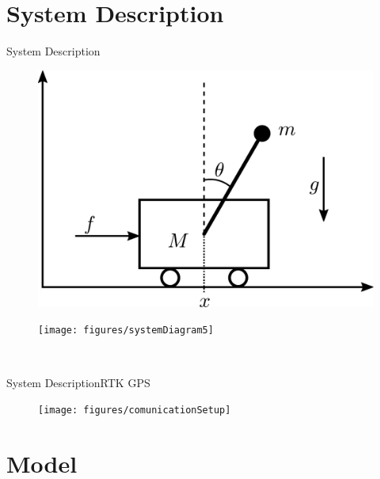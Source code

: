 \section{System Description}
\begin{frame}{System Description}{}
    \begin{minipage}{0.47\linewidth}
    \begin{figure}[H]
        \centering
        \includegraphics[width=1\linewidth]{figures/system}
    \end{figure}        
    \end{minipage}\hfill      
    \begin{minipage}{0.49\linewidth}
    \begin{figure}[H]
        \centering
        \texttt{[image: figures/systemDiagram5]}
    \end{figure}                
    \end{minipage}\hfill \\
\end{frame}

\begin{frame}{System Description}{RTK GPS}
    \begin{figure}[H]
        \centering
        \texttt{[image: figures/comunicationSetup]}
    \end{figure}        

\end{frame}

\section{Model}

